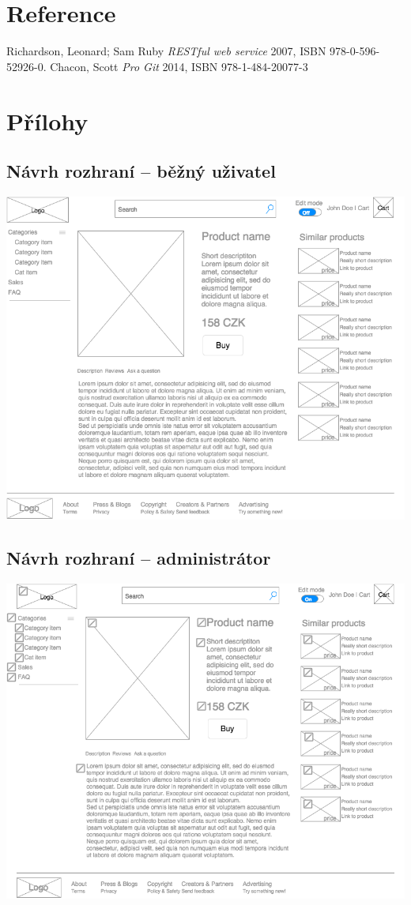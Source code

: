 \documentclass[11pt,a4paper]{article}
\begin{document}
\section*{Reference} %
\begin{thebibliography}{1}

   Richardson, Leonard; Sam Ruby {\em  RESTful web service} 2007, ISBN 978-0-596-52926-0.
   Chacon, Scott {\em Pro Git} 2014, ISBN 978-1-484-20077-3

\end{thebibliography}

\section*{Přílohy}

\subsection*{Návrh rozhraní -- běžný uživatel}
\includegraphics[scale=0.6]{pyngshop.png}
\subsection*{Návrh rozhraní -- administrátor}
\includegraphics[scale=0.6]{pyngshop_edit.png}
\newpage
\end{document}
